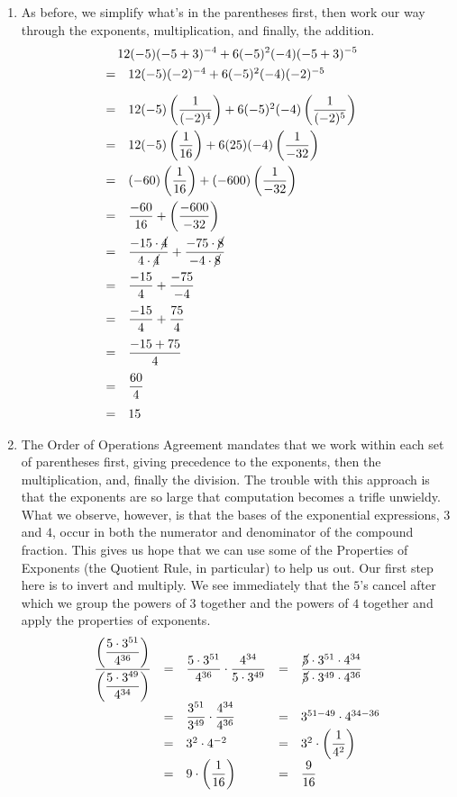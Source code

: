 \begin{ex}
\begin{enumerate}
\item  As before, we simplify what's in the parentheses first, then work our way through the exponents, multiplication, and finally, the addition.
\begin{multline*}
12(-5)(-5+3)^{-4}+6(-5)^2(-4)(-5+3)^{-5} \\
\begin{array}{clr}
= & 12(-5)(-2)^{-4} + 6(-5)^{2}(-4)(-2)^{-5} \\ [10pt]
= & 12(-5)\left(\dfrac{1}{(-2)^4}\right) + 6(-5)^{2}(-4)\left(\dfrac{1}{(-2)^5}\right)& \\ [10pt]
= & 12(-5)\left(\dfrac{1}{16}\right) + 6(25)(-4)\left(\dfrac{1}{-32}\right)& \\ [10pt]
= & (-60)\left(\dfrac{1}{16}\right) + (-600)\left(\dfrac{1}{-32}\right)& \\ [10pt]
= & \dfrac{-60}{16} + \left(\dfrac{-600}{-32}\right)&  \\ [10pt]
= & \dfrac{-15\cdot \cancel{4}}{4 \cdot \cancel{4}} + \dfrac{-75 \cdot \cancel{8}}{-4 \cdot \cancel{8}} & \\ [10pt]
= & \dfrac{-15}{4} + \dfrac{-75}{-4} & \\ [10pt]
= & \dfrac{-15}{4} + \dfrac{75}{4} & \\ [10pt]
= & \dfrac{-15 + 75}{4} & \\ [10pt]
= & \dfrac{60}{4} & \\ [10pt]
= & 15 & \\ 
\end{array}
\end{multline*}
				
\item  The Order of Operations Agreement mandates that we work within each set of parentheses first, giving precedence to the exponents, then the multiplication, and, finally the division.  The trouble with this approach is that the exponents are so large that computation becomes a trifle unwieldy.   What we observe, however, is that the bases of the exponential expressions, $3$ and $4$, occur in both the numerator and denominator of the compound fraction.  This gives us hope that we can use some of the Properties of Exponents (the Quotient Rule, in particular) to help us out. Our first step here is to invert and multiply.  We see immediately that the $5$'s cancel after which we group the powers of $3$ together and the powers of $4$ together and apply the properties of exponents.\[ \begin{array}{rclcl}

\dfrac{\left(\dfrac{5\cdot 3^{51}}{4^{36}}\right)}{\left(\dfrac{5 \cdot 3^{49}}{4^{34}}\right)} & = & \dfrac{5\cdot 3^{51}}{4^{36}} \cdot \dfrac{4^{34}}{5 \cdot 3^{49}} & = & \dfrac{\cancel{5} \cdot 3^{51} \cdot 4^{34}}{\cancel{5} \cdot 3^{49} \cdot 4^{36}} \\
& = & \dfrac{3^{51}}{3^{49}} \cdot\dfrac{4^{34}}{4^{36}} & = & 3^{51-49} \cdot 4^{34-36} \\
& = & 3^{2} \cdot 4^{-2} & = & 3^{2} \cdot \left( \dfrac{1}{4^2}\right) \\
& = & 9 \cdot \left(\dfrac{1}{16} \right) & = & \dfrac{9}{16} \\ \end{array} \]


\end{enumerate}
\end{ex}

